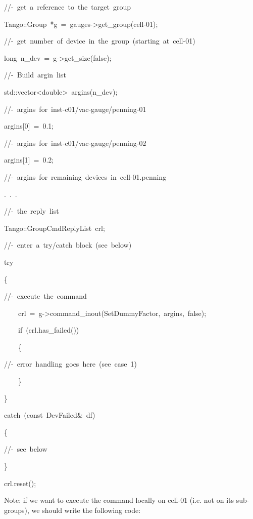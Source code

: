 
\begin{lyxcode}
//-~get~a~reference~to~the~target~group

Tango::Group~{*}g~=~gauges->get\_group(\textquotedbl{}cell-01\textquotedbl{});

//-~get~number~of~device~in~the~group~(starting~at~cell-01)

long~n\_dev~=~g->get\_size(false);

//-~Build~argin~list

std::vector<double>~argins(n\_dev);

//-~argins~for~inst-c01/vac-gauge/penning-01

argins{[}0{]}~=~0.1;

//-~argins~for~inst-c01/vac-gauge/penning-02

argins{[}1{]}~=~0.2;

//-~argins~for~remaining~devices~in~cell-01.penning

.~.~.

//-~the~reply~list

Tango::GroupCmdReplyList~crl;

//-~enter~a~try/catch~block~(see~below)

try

\{

//-~execute~the~command

~~~~crl~=~g->command\_inout(\textquotedbl{}SetDummyFactor\textquotedbl{},~argins,~false);

~~~~if~(crl.has\_failed())

~~~~\{

//-~error~handling~goes~here~(see~case~1)

~~~~\}

\}

catch~(const~DevFailed\&~df)

\{

//-~see~below

\}

crl.reset();
\end{lyxcode}


Note: if we want to execute the command locally on \textquotedbl{}cell-01\textquotedbl{}
(i.e. not on its sub-groups), we should write the following code:

